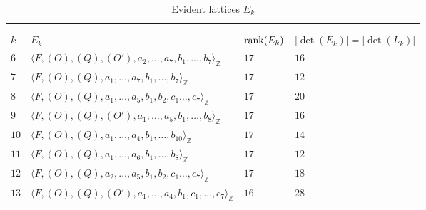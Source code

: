 \documentclass[10pt]{article}
\begin{document}
\begin{longtable}{llll}
  \caption{\normalsize{Evident lattices $E_k$ }}
  \vspace{-5.5mm}\\
  \\
\hline
  $k$ & $E_k$ & ${\rm rank}(E_k)$ & $|\det(E_k)|=|\det (L_k)|$   
    \\
  \hline
  \endhead
\vspace{1mm}$6$ &$\langle F, (O), (Q), (O'),  a_2 ,\ldots, a_7,b_1,\ldots,b_7 \rangle_\mathbb{Z}$ & \hspace{3.9mm} $17$ &\hspace{12.9mm} $ 16$   \\
\vspace{1mm} $7$ &  $\langle F, (O), (Q), a_1 ,\ldots, a_7,b_1,\ldots,b_7 \rangle_\mathbb{Z}$ &\hspace{3.9mm} $17$ &\hspace{12.9mm} $12$\\
\vspace{1mm}$8$  & $\langle F, (O), (Q), a_1 ,\ldots, a_5,b_1, b_2, c_1\ldots,c_7 \rangle_\mathbb{Z}$  &\hspace{3.9mm} $17$ &\hspace{12.9mm} $20$   \\
\vspace{1mm}$9$ & $\langle F, (O), (Q), (O'), a_1 ,\ldots,a_5, b_1,\ldots ,b_8 \rangle_\mathbb{Z}$ &\hspace{3.9mm} $17$  &\hspace{12.9mm} $16$    \\
\vspace{1mm}$10$ &$\langle F, (O),(Q), a_1 ,\ldots, a_4,b_1, \ldots,b_{10} \rangle_\mathbb{Z}$&\hspace{3.9mm} $17$  &\hspace{12.9mm} $14$   \\
\vspace{1mm}$11$ &$\langle F, (O),  (Q),a_1 ,\ldots, a_6,b_1, \ldots,b_{8} \rangle_\mathbb{Z}$  &\hspace{3.9mm} $17$ &\hspace{12.9mm} $12$  \\
\vspace{1mm}$12$ &$\langle F, (O), (Q), a_2 ,\ldots, a_5, b_1,b_2,  c_1\ldots,c_7 \rangle_\mathbb{Z}$ &\hspace{3.9mm} $17$ &\hspace{12.9mm} $18$   \\
\vspace{1mm}$13$ &$\langle F, (O), (Q),(O'), a_1 ,\ldots,a_4, b_1, c_1,\ldots ,c_7 \rangle_\mathbb{Z} $ &\hspace{3.9mm} $16$ &\hspace{12.9mm} $28$    \\

\end{longtable}
\end{document}
